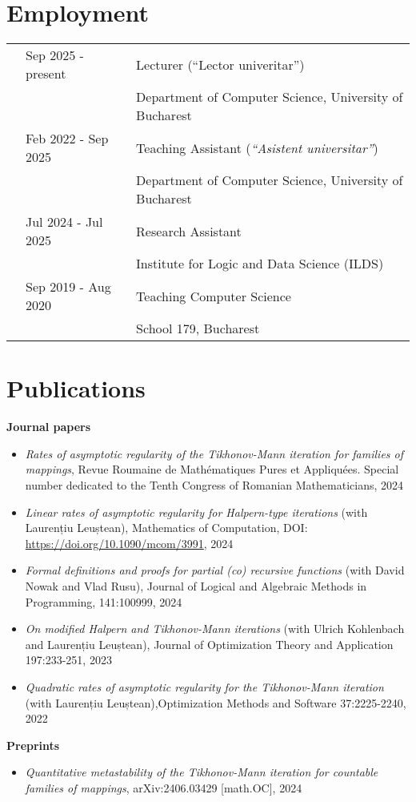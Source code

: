 \documentclass[letterpaper,11pt,oneside]{article}
\begin{document}
\noindent
\section{Employment}
\normalsize
\begin{tabular}{@{} l l l}
        & Sep 2025 - present & Lecturer (``Lector univeritar'') \\
        &                    & Department of Computer Science, University of Bucharest \\
        & Feb 2022 - Sep 2025 & Teaching Assistant (\textit{``Asistent universitar''}) \\ 
        &                & Department of Computer Science, University of Bucharest \\
        & Jul 2024 - Jul 2025 & Research Assistant \\ 
        &                    & Institute for Logic and Data Science (ILDS) \\
        & Sep 2019 - Aug 2020    & Teaching Computer Science \\
        &                & School 179, Bucharest 
\end{tabular}


\noindent
\section{Publications} 
\large\textbf{Journal papers}
\normalsize
\begin{itemize}
    \item \emph{Rates of asymptotic regularity of the Tikhonov-Mann iteration for families of mappings}, {Revue Roumaine de Math\'{e}matiques Pures et Appliqu\'{e}es. Special number dedicated to the Tenth Congress of Romanian Mathematicians}, 2024
    \item \emph{Linear rates of asymptotic regularity for Halpern-type iterations} (with Laurențiu Leuștean), Mathematics of Computation, DOI: \url{https://doi.org/10.1090/mcom/3991}, 2024
    \item \emph{Formal definitions and proofs for partial (co) recursive functions} (with David Nowak and Vlad Rusu), Journal of Logical and Algebraic Methods in Programming, 141:100999, 2024
    \item \emph{On modified Halpern and Tikhonov-Mann iterations} (with Ulrich Kohlenbach and Laurențiu Leuștean), Journal of Optimization Theory and Application 197:233-251, 2023
    \item \emph{Quadratic rates of asymptotic regularity for the Tikhonov-Mann iteration} (with Laurențiu Leuștean),Optimization Methods and Software 37:2225-2240, 2022
\end{itemize}
\large\textbf{Preprints}
\begin{itemize}
    \item \emph{Quantitative metastability of the Tikhonov-Mann iteration for countable families of mappings}, 	arXiv:2406.03429 [math.OC], 2024
\end{itemize}
\mbox{} 
\end{document}
